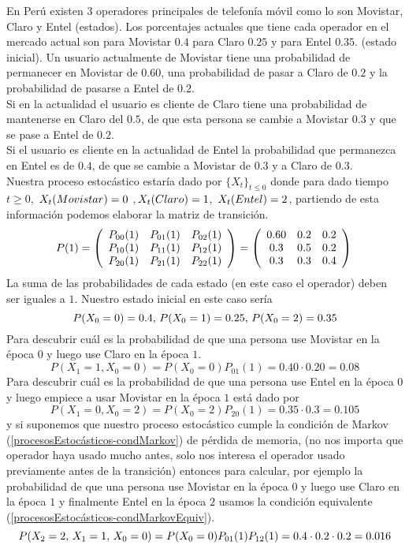 \begin{Ejm}
    En Perú existen $3$ operadores principales de telefonía móvil como lo son Movistar, Claro y Entel (estados).
    Los porcentajes actuales que tiene cada operador en el mercado actual son para Movistar $0.4$ para Claro $0.25$ y para Entel $0.35$. (estado inicial).
    Un usuario actualmente de Movistar tiene una probabilidad de permanecer en Movistar de $0.60$, una probabilidad de pasar a Claro de $0.2$ y la probabilidad de pasarse a Entel de $0.2$.\\Si en la actualidad el usuario es cliente de Claro tiene una probabilidad de mantenerse en Claro del $0.5$, de que esta persona se cambie a Movistar  $0.3$ y que se pase a Entel de $0.2$.\\Si el usuario es cliente en la actualidad de Entel la probabilidad que permanezca en Entel es de $0.4$, de que se cambie a Movistar de $0.3$ y a Claro de $0.3$.\\
    Nuestra proceso estocástico estaría dado por $\{X_t\}_{t\leq 0}$ donde para dado tiempo $t\geq 0$, $\thinspace X_t(Movistar)=0$ ,$\thinspace X_t(Claro)=1$, $\thinspace X_t(Entel)=2$, partiendo de esta información podemos elaborar la matriz de transición.
   $$P(1)=\left( \begin{array}{ccc}
    P_{0 0}(1) & P_{0 1}(1) & P_{0 2}(1) \\
    P_{1 0}(1) & P_{1 1}(1) & P_{1 2}(1) \\
    P_{2 0}(1) & P_{2 1}(1) & P_{2 2}(1)  
    \end{array}\right)=
    \left( \begin{array}{ccc}
    0.60 & 0.2 & 0.2 \\ 
    0.3 & 0.5 & 0.2 \\
    0.3 & 0.3 & 0.4
    \end{array}\right)\\$$
    La suma de las probabilidades de cada estado (en este caso el operador) deben ser iguales a $1$. Nuestro estado inicial en este caso sería $$P(X_0 = 0)= 0.4,\thinspace P(X_0 = 1)= 0.25 ,\thinspace P(X_0 = 2)= 0.35$$
    Para descubrir cuál es la probabilidad de que una persona use Movistar en la época $0$ y luego use Claro en la época $1$. 
    $$P(X_1=1 , X_0=0) = P(X_0=0)P_{01}(1)= 0.40\cdot 0.20 =0.08$$
    Para descubrir cuál es la probabilidad de que una persona use Entel en la época $0$ y luego empiece a usar Movistar en la época $1$ está dado por
    $$P(X_1=0 , X_0=2) = P(X_0=2)P_{20}(1)=0.35\cdot 0.3 =0.105$$
    y si suponemos que nuestro proceso estocástico cumple la condición de Markov (\ref{procesosEstocásticos-condMarkov}) de pérdida de memoria, (no nos importa que operador haya usado mucho antes, solo nos interesa el operador usado previamente antes de la transición) entonces para calcular, por ejemplo la probabilidad de que una persona use Movistar en la época $0$ y luego use Claro en la época $1$ y finalmente Entel en la época $2$ usamos la condición equivalente (\ref{procesosEstocásticos-condMarkovEquiv}).
    $$P(X_2=2,\thinspace X_1=1,\thinspace X_0=0)=P(X_0=0)P_{01}(1)P_{12}(1)=0.4\cdot 0.2\cdot 0.2=0.016$$
    \end{Ejm}
